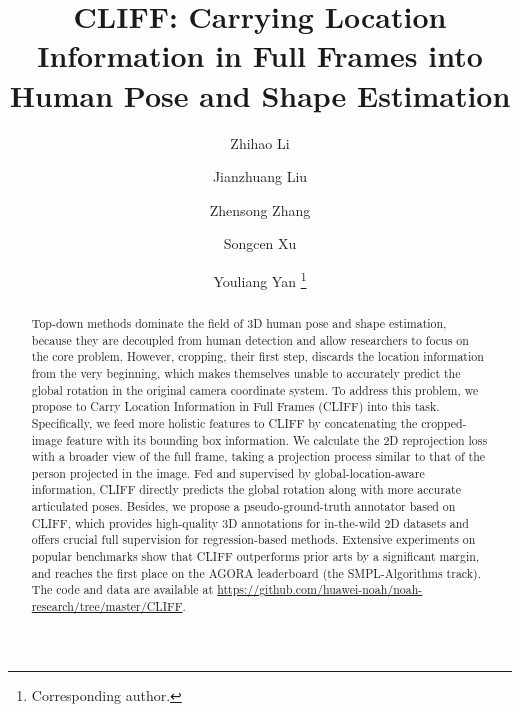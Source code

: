 \documentclass[runningheads]{llncs}
\begin{document}
\pagestyle{headings}
\mainmatter
\def\ECCVSubNumber{1620}  

\title{CLIFF: Carrying Location Information in Full Frames into Human Pose and Shape Estimation} 

\begin{comment}
\titlerunning{ECCV-22 submission ID \ECCVSubNumber}
\authorrunning{ECCV-22 submission ID \ECCVSubNumber}
\author{Anonymous ECCV submission}
\institute{Paper ID \ECCVSubNumber}
\end{comment}




\author{
Zhihao Li \and
Jianzhuang Liu \and
Zhensong Zhang \and
Songcen Xu \and
Youliang Yan \thanks{Corresponding author.}
}



\maketitle

\begin{abstract}
Top-down methods dominate the field of 3D human pose and shape estimation, because they are decoupled from human detection and allow researchers to focus on the core problem. However, cropping, their first step, discards the location information from the very beginning, which makes themselves unable to accurately predict the global rotation in the original camera coordinate system. To address this problem, we propose to Carry Location Information in Full Frames (CLIFF) into this task. Specifically, we feed more holistic features to CLIFF by concatenating the cropped-image feature with its bounding box information. We calculate the 2D reprojection loss with a broader view of the full frame, taking a projection process similar to that of the person projected in the image. Fed and supervised by global-location-aware information, CLIFF directly predicts the global rotation along with more accurate articulated poses. Besides, we propose a pseudo-ground-truth annotator based on CLIFF, which provides high-quality 3D annotations for in-the-wild 2D datasets and offers crucial full supervision for regression-based methods. Extensive experiments on popular benchmarks show that CLIFF outperforms prior arts by a significant margin, and reaches the first place on the AGORA leaderboard (the SMPL-Algorithms track). The code and data are available at \url{https://github.com/huawei-noah/noah-research/tree/master/CLIFF}.

\end{abstract}
\end{document}

